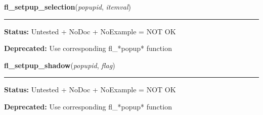     \label{xformslib:library:fl_setpup_selection}

    \vspace{0.5ex}

\hspace{.8\funcindent}\begin{boxedminipage}{\funcwidth}

    \raggedright \textbf{fl\_setpup\_selection}(\textit{popupid}, \textit{itemval})

    \vspace{-1.5ex}

    \rule{\textwidth}{0.5\fboxrule}
\setlength{\parskip}{2ex}
\setlength{\parskip}{1ex}
\textbf{Status:} Untested + NoDoc + NoExample = NOT OK



\textbf{Deprecated:} Use corresponding fl\_*popup* function



    \end{boxedminipage}

    \label{xformslib:library:fl_setpup_shadow}

    \vspace{0.5ex}

\hspace{.8\funcindent}\begin{boxedminipage}{\funcwidth}

    \raggedright \textbf{fl\_setpup\_shadow}(\textit{popupid}, \textit{flag})

    \vspace{-1.5ex}

    \rule{\textwidth}{0.5\fboxrule}
\setlength{\parskip}{2ex}
\setlength{\parskip}{1ex}
\textbf{Status:} Untested + NoDoc + NoExample = NOT OK



\textbf{Deprecated:} Use corresponding fl\_*popup* function



    \end{boxedminipage}

    \label{xformslib:library:fl_setpup_softedge}

